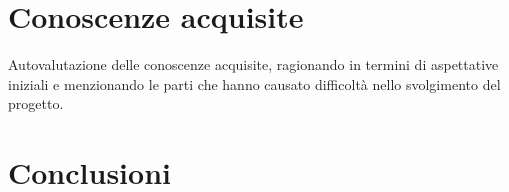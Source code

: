 \section{Conoscenze acquisite}

Autovalutazione delle conoscenze acquisite, ragionando in termini di aspettative iniziali e menzionando le parti che hanno causato difficoltà nello svolgimento del progetto.


\section{Conclusioni}
